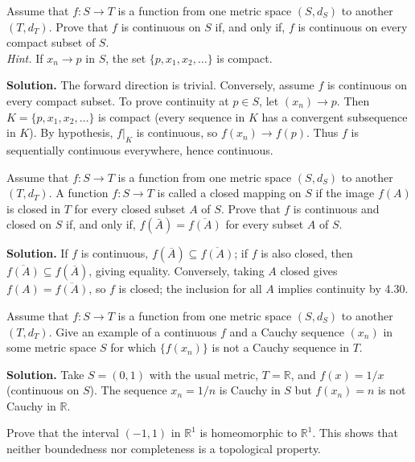 \begin{problembox}
Assume that $f : S \rightarrow T$ is a function from one metric space $(S, d_S)$ to another $(T, d_T)$. Prove that $f$ is continuous on $S$ if, and only if, $f$ is continuous on every compact subset of $S$. \\
\textit{Hint.} If $x_n \rightarrow p$ in $S$, the set $\{p, x_1, x_2, \ldots\}$ is compact.
\end{problembox}

\noindent\textbf{Solution.}
The forward direction is trivial. Conversely, assume $f$ is continuous on every compact subset. To prove continuity at $p\in S$, let $(x_n)\to p$. Then $K=\{p,x_1,x_2,\ldots\}$ is compact (every sequence in $K$ has a convergent subsequence in $K$). By hypothesis, $f|_K$ is continuous, so $f(x_n)\to f(p)$. Thus $f$ is sequentially continuous everywhere, hence continuous.
\medskip

\begin{problembox}
Assume that $f : S \rightarrow T$ is a function from one metric space $(S, d_S)$ to another $(T, d_T)$. A function $f : S \rightarrow T$ is called a closed mapping on $S$ if the image $f(A)$ is closed in $T$ for every closed subset $A$ of $S$. Prove that $f$ is continuous and closed on $S$ if, and only if, $f(\bar{A}) = \overline{f(A)}$ for every subset $A$ of $S$.
\end{problembox}

\noindent\textbf{Solution.}
If $f$ is continuous, $f(\overline{A})\subseteq\overline{f(A)}$; if $f$ is also closed, then $\overline{f(A)}\subseteq f(\overline{A})$, giving equality. Conversely, taking $A$ closed gives $f(A)=\overline{f(A)}$, so $f$ is closed; the inclusion for all $A$ implies continuity by 4.30.
\medskip

\begin{problembox}
Assume that $f : S \rightarrow T$ is a function from one metric space $(S, d_S)$ to another $(T, d_T)$. Give an example of a continuous $f$ and a Cauchy sequence $(x_n)$ in some metric space $S$ for which $\{f(x_n)\}$ is not a Cauchy sequence in $T$.
\end{problembox}

\noindent\textbf{Solution.}
Take $S=(0,1)$ with the usual metric, $T=\mathbb{R}$, and $f(x)=1/x$ (continuous on $S$). The sequence $x_n=1/n$ is Cauchy in $S$ but $f(x_n)=n$ is not Cauchy in $\mathbb{R}$.
\medskip

\begin{problembox}
Prove that the interval $(-1, 1)$ in $\mathbb{R}^1$ is homeomorphic to $\mathbb{R}^1$. This shows that neither boundedness nor completeness is a topological property.
\end{problembox}

